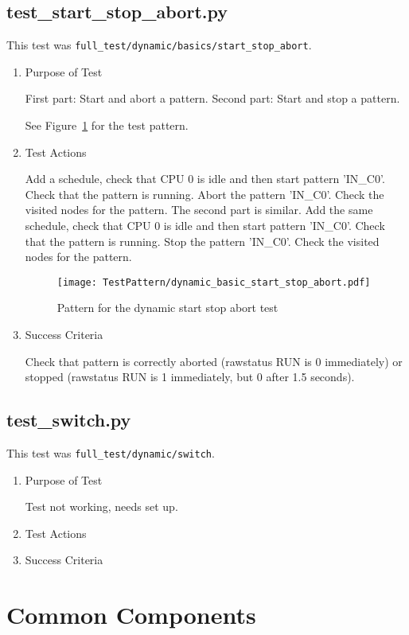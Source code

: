 \documentclass[12pt,a4paper]{report}
\begin{document}
\section{test\_start\_stop\_abort.py}
This test was \texttt{full\_test/dynamic/basics/start\_stop\_abort}.
\begin{enumerate}
  \item Purpose of Test

    First part: Start and abort a pattern. Second part: Start and stop a pattern.

  See Figure~\ref{fig:Pattern_for_the_dynamic_start_stop_abort_test} for the test pattern.
  \item Test Actions

    Add a schedule, check that CPU 0 is idle and then start pattern 'IN\_C0'. Check that the pattern is running.
    Abort the pattern 'IN\_C0'. Check the visited nodes for the pattern. The second part is similar.
    Add the same schedule, check that CPU 0 is idle and then start pattern 'IN\_C0'. Check that the pattern is running.
    Stop the pattern 'IN\_C0'. Check the visited nodes for the pattern.
    \begin{figure}
        \centering
        \texttt{[image: TestPattern/dynamic\_basic\_start\_stop\_abort.pdf]}
        \caption{Pattern for the dynamic start stop abort test}
        \label{fig:Pattern_for_the_dynamic_start_stop_abort_test}
    \end{figure}
  \item Success Criteria

  Check that pattern is correctly aborted (rawstatus RUN is 0 immediately) or
  stopped (rawstatus RUN is 1 immediately, but 0 after 1.5 seconds).
\end{enumerate}

\section{test\_switch.py}
This test was \texttt{full\_test/dynamic/switch}.
\begin{enumerate}
  \item Purpose of Test

  Test not working, needs set up.
  \item Test Actions
  \item Success Criteria
\end{enumerate}
\chapter{Common Components}
\end{document}
